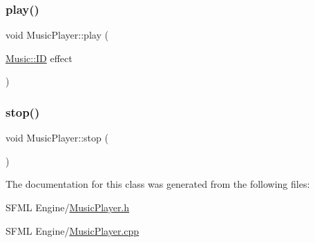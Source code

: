 \mbox{\label{class_music_player_aa3273ed0e4d434993a80b04c1c5b9b97}} 
\subsubsection{\texorpdfstring{play()}{play()}}
{\footnotesize\ttfamily void Music\+Player\+::play (\begin{DoxyParamCaption}\item[{\hyperlink{namespace_music_ad5e0c8c2e2e7bdcbffbb125051531b86}{Music\+::\+ID}}]{effect }\end{DoxyParamCaption})}

\mbox{\label{class_music_player_a54e47a9e937730493d886aa5624c44d1}} 
\subsubsection{\texorpdfstring{stop()}{stop()}}
{\footnotesize\ttfamily void Music\+Player\+::stop (\begin{DoxyParamCaption}{ }\end{DoxyParamCaption})}



The documentation for this class was generated from the following files\+:\begin{DoxyCompactItemize}
\item 
S\+F\+M\+L Engine/\hyperlink{_music_player_8h}{Music\+Player.\+h}\item 
S\+F\+M\+L Engine/\hyperlink{_music_player_8cpp}{Music\+Player.\+cpp}\end{DoxyCompactItemize}
